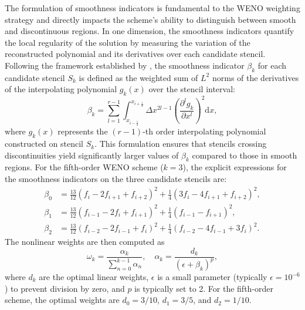 The formulation of smoothness indicators is fundamental to the WENO weighting strategy and directly impacts the scheme's ability to distinguish between smooth and discontinuous regions. In one dimension, the smoothness indicators quantify the local regularity of the solution by measuring the variation of the reconstructed polynomial and its derivatives over each candidate stencil. Following the framework established by \citet{JiangShu1996}, the smoothness indicator $\beta_k$ for each candidate stencil $S_k$ is defined as the weighted sum of $L^2$ norms of the derivatives of the interpolating polynomial $g_k(x)$ over the stencil interval:
\begin{equation}
\beta_k = \sum_{l=1}^{r-1} \int_{x_{i-\frac{1}{2}}}^{x_{i+\frac{1}{2}}} \Delta x^{2l-1} \left( \frac{\partial^l g_k}{\partial x^l} \right)^2 \mathrm{d}x,
\end{equation}
where $g_k(x)$ represents the $(r-1)$-th order interpolating polynomial constructed on stencil $S_k$. This formulation ensures that stencils crossing discontinuities yield significantly larger values of $\beta_k$ compared to those in smooth regions. For the fifth-order WENO scheme ($k=3$), the explicit expressions for the smoothness indicators on the three candidate stencils are:
\begin{align}
\beta_0 &= \frac{13}{12}(f_i - 2f_{i+1} + f_{i+2})^2 + \frac{1}{4}(3f_i - 4f_{i+1} + f_{i+2})^2, \\
\beta_1 &= \frac{13}{12}(f_{i-1} - 2f_i + f_{i+1})^2 + \frac{1}{4}(f_{i-1} - f_{i+1})^2, \\
\beta_2 &= \frac{13}{12}(f_{i-2} - 2f_{i-1} + f_i)^2 + \frac{1}{4}(f_{i-2} - 4f_{i-1} + 3f_i)^2.
\end{align}
The nonlinear weights are then computed as
\begin{equation}
\omega_k = \frac{\alpha_k}{\sum_{n=0}^{k-1} \alpha_n}, \quad \alpha_k = \frac{d_k}{(\epsilon + \beta_k)^p},
\end{equation}
where $d_k$ are the optimal linear weights, $\epsilon$ is a small parameter (typically $\epsilon = 10^{-6}$) to prevent division by zero, and $p$ is typically set to 2. For the fifth-order scheme, the optimal weights are $d_0 = 3/10$, $d_1 = 3/5$, and $d_2 = 1/10$.

